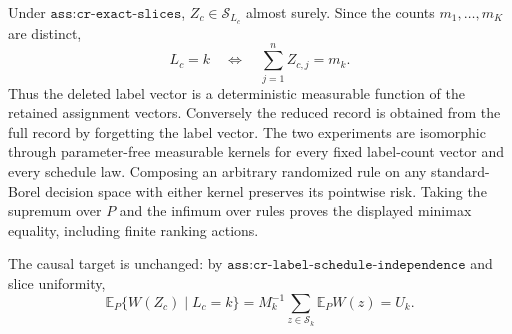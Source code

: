 Under \(\texttt{ass:cr-exact-slices}\), \(Z_c\in\mathcal S_{L_c}\) almost surely.  Since the counts \(m_1,\ldots,m_K\) are distinct,
\[
 L_c=k\quad\Longleftrightarrow\quad \sum_{j=1}^nZ_{c,j}=m_k. \tag{8}
\]
Thus the deleted label vector is a deterministic measurable function of the retained assignment vectors.  Conversely the reduced record is obtained from the full record by forgetting the label vector.  The two experiments are isomorphic through parameter-free measurable kernels for every fixed label-count vector and every schedule law.  Composing an arbitrary randomized rule on any standard-Borel decision space with either kernel preserves its pointwise risk.  Taking the supremum over \(P\) and the infimum over rules proves the displayed minimax equality, including finite ranking actions.

The causal target is unchanged: by \(\texttt{ass:cr-label-schedule-independence}\) and slice uniformity,
\[
 \mathbb E_P\{W(Z_c)\mid L_c=k\}
 =M_k^{-1}\sum_{z\in\mathcal S_k}\mathbb E_PW(z)=U_k. \tag{9}
\]